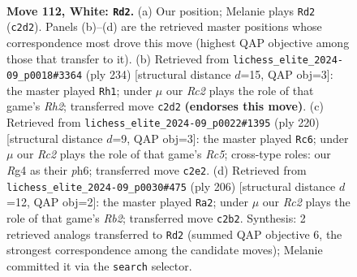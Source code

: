 \documentclass[11pt]{article}
\begin{document}
\clearpage

\begin{figure}[p]\centering
\begin{subfigure}{0.46\textwidth}\centering
\resizebox{\linewidth}{!}{%
\newchessgame
\chessboard[
  setfen={8/4k3/4p3/4P3/5PR1/8/2R2K2/7r w - - 9 112},
  showmover=false,
  pgfstyle=straightmove, color=movearrow, markmove={c2-d2}
]}
\caption{}
\end{subfigure}\hfill
\begin{subfigure}{0.46\textwidth}\centering
\resizebox{\linewidth}{!}{%
\newchessgame
\chessboard[
  setfen={8/7k/6p1/7p/5r1P/8/4K2R/8 w - - 96 118},
  showmover=false,
  pgfstyle=straightmove, color=movearrow, markmove={h2-h1}
]}
\caption{}
\end{subfigure}
\\[4pt]
\begin{subfigure}{0.46\textwidth}\centering
\resizebox{\linewidth}{!}{%
\newchessgame
\chessboard[
  setfen={8/2K2kp1/7p/2R1P2P/8/8/3r4/8 w - - 40 111},
  showmover=false,
  pgfstyle=straightmove, color=movearrow, markmove={c5-c6}
]}
\caption{}
\end{subfigure}\hfill
\begin{subfigure}{0.46\textwidth}\centering
\resizebox{\linewidth}{!}{%
\newchessgame
\chessboard[
  setfen={8/6k1/8/7p/7P/6P1/1R4K1/2r5 w - - 53 104},
  showmover=false,
  pgfstyle=straightmove, color=movearrow, markmove={b2-a2}
]}
\caption{}
\end{subfigure}
\caption{\textbf{Move 112, White: \texttt{Rd2}.} (a) Our position; Melanie plays \texttt{Rd2} (\texttt{c2d2}). Panels (b)--(d) are the retrieved master positions whose correspondence most drove this move (highest QAP objective among those that transfer to it). (b) Retrieved from \texttt{lichess\_elite\_2024-09\_p0018\#3364} (ply 234) [structural distance $d$=15, QAP obj=3]: the master played \texttt{Rh1}; under $\mu$ our \emph{Rc2} plays the role of that game's \emph{Rh2}; transferred move \texttt{c2d2} \textbf{(endorses this move)}. (c) Retrieved from \texttt{lichess\_elite\_2024-09\_p0022\#1395} (ply 220) [structural distance $d$=9, QAP obj=3]: the master played \texttt{Rc6}; under $\mu$ our \emph{Rc2} plays the role of that game's \emph{Rc5}; cross-type roles: our \emph{R}g4 as their \emph{p}h6; transferred move \texttt{c2e2}. (d) Retrieved from \texttt{lichess\_elite\_2024-09\_p0030\#475} (ply 206) [structural distance $d$=12, QAP obj=2]: the master played \texttt{Ra2}; under $\mu$ our \emph{Rc2} plays the role of that game's \emph{Rb2}; transferred move \texttt{c2b2}. Synthesis: 2 retrieved analogs transferred to \texttt{Rd2} (summed QAP objective 6, the strongest correspondence among the candidate moves); Melanie committed it via the \texttt{search} selector.}
\label{fig:thought-m222}
\end{figure}
\end{document}
